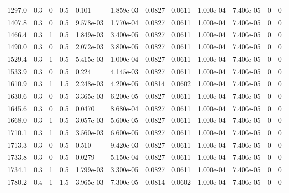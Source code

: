 \documentclass[preview]{standalone}
\begin{document}
{{\begin{tabular}{L{1.2cm}C{1.2cm} C{0.3cm}C{0.5cm} C{1.4cm}C{1.4cm} C{1.4cm}C{1.4cm} C{1.6cm}C{1.6cm} C{1.6cm}C{1.6cm}}
  1297.0  &   0.3  & 0     & 0.5 &  0.101  & 1.859e-03  &  0.0827&   0.0611& 1.000e-04 & 7.400e-05   &  0 & 0  \\ 
  1407.8  &   0.3  & 0     & 0.5 &  9.578e-03  & 1.770e-04  &  0.0827&   0.0611& 1.000e-04 & 7.400e-05   &  0 & 0  \\ 
  1466.4  &   0.3  & 1     & 0.5 &  1.849e-03  & 3.400e-05  &  0.0827&   0.0611& 1.000e-04 & 7.400e-05   &  0 & 0  \\ 
  1490.0  &   0.3  & 0     & 0.5 &  2.072e-03  & 3.800e-05  &  0.0827&   0.0611& 1.000e-04 & 7.400e-05   &  0 & 0  \\ 
  1529.4  &   0.3  & 1     & 0.5 &  5.415e-03  & 1.000e-04  &  0.0827&   0.0611& 1.000e-04 & 7.400e-05   &  0 & 0  \\ 
  1533.9  &   0.3  & 0     & 0.5 &  0.224  & 4.145e-03  &  0.0827&   0.0611& 1.000e-04 & 7.400e-05   &  0 & 0  \\ 
  1610.9  &   0.3  & 1     & 1.5 &  2.248e-03  & 4.200e-05  &  0.0814&   0.0602& 1.000e-04 & 7.400e-05   &  0 & 0  \\ 
  1630.6  &   0.3  & 0     & 0.5 &  3.365e-03  & 6.200e-05  &  0.0827&   0.0611& 1.000e-04 & 7.400e-05   &  0 & 0  \\ 
  1645.6  &   0.3  & 0     & 0.5 &  0.0470  & 8.680e-04  &  0.0827&   0.0611& 1.000e-04 & 7.400e-05   &  0 & 0  \\ 
  1668.0  &   0.3  & 1     & 0.5 &  3.057e-03  & 5.600e-05  &  0.0827&   0.0611& 1.000e-04 & 7.400e-05   &  0 & 0  \\ 
  1710.1  &   0.3  & 1     & 0.5 &  3.560e-03  & 6.600e-05  &  0.0827&   0.0611& 1.000e-04 & 7.400e-05   &  0 & 0  \\ 
  1713.3  &   0.3  & 0     & 0.5 &  0.510  & 9.420e-03  &  0.0827&   0.0611& 1.000e-04 & 7.400e-05   &  0 & 0  \\ 
  1733.8  &   0.3  & 0     & 0.5 &  0.0279  & 5.150e-04  &  0.0827&   0.0611& 1.000e-04 & 7.400e-05   &  0 & 0  \\ 
  1734.1  &   0.3  & 1     & 0.5 &  1.799e-03  & 3.300e-05  &  0.0827&   0.0611& 1.000e-04 & 7.400e-05   &  0 & 0  \\ 
  1780.2  &   0.4  & 1     & 1.5 &  3.965e-03  & 7.300e-05  &  0.0814&   0.0602& 1.000e-04 & 7.400e-05   &  0 & 0  \\ 
\hline 
\end{tabular} 

}}
\end{document}
